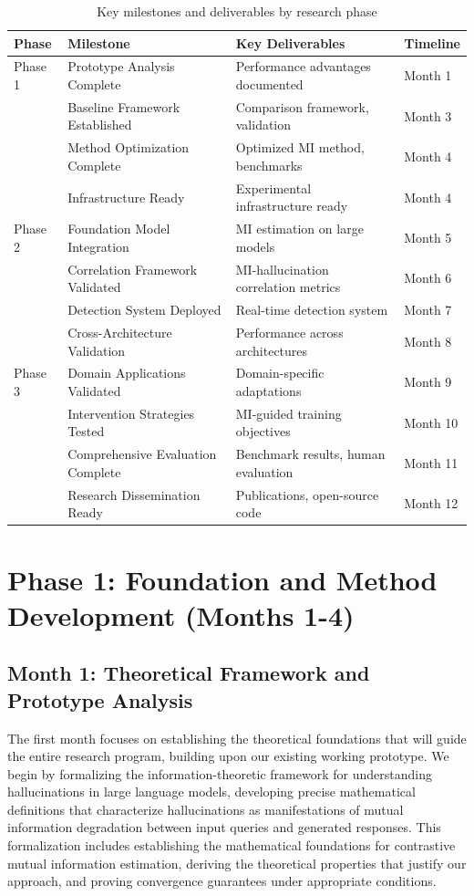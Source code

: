 \documentclass[11pt, oneside]{book}
\theoremstyle{plain}
\theoremstyle{definition}
\theoremstyle{remark}
\begin{document}
\begin{table}[htbp]
\centering
\caption{Key milestones and deliverables by research phase}
\label{tab:milestones}
\small
\begin{tabular}{|l|l|l|l|}
\hline
\textbf{Phase} & \textbf{Milestone} & \textbf{Key Deliverables} & \textbf{Timeline} \\
\hline
Phase 1 & Prototype Analysis Complete & Performance advantages documented & Month 1 \\
& Baseline Framework Established & Comparison framework, validation & Month 3 \\
& Method Optimization Complete & Optimized MI method, benchmarks & Month 4 \\
& Infrastructure Ready & Experimental infrastructure ready & Month 4 \\
\hline
Phase 2 & Foundation Model Integration & MI estimation on large models & Month 5 \\
& Correlation Framework Validated & MI-hallucination correlation metrics & Month 6 \\
& Detection System Deployed & Real-time detection system & Month 7 \\
& Cross-Architecture Validation & Performance across architectures & Month 8 \\
\hline
Phase 3 & Domain Applications Validated & Domain-specific adaptations & Month 9 \\
& Intervention Strategies Tested & MI-guided training objectives & Month 10 \\
& Comprehensive Evaluation Complete & Benchmark results, human evaluation & Month 11 \\
& Research Dissemination Ready & Publications, open-source code & Month 12 \\
\hline
\end{tabular}
\end{table}

\section{Phase 1: Foundation and Method Development (Months 1-4)}

\subsection{Month 1: Theoretical Framework and Prototype Analysis}

The first month focuses on establishing the theoretical foundations that will guide the entire research program, building upon our existing working prototype. We begin by formalizing the information-theoretic framework for understanding hallucinations in large language models, developing precise mathematical definitions that characterize hallucinations as manifestations of mutual information degradation between input queries and generated responses. This formalization includes establishing the mathematical foundations for contrastive mutual information estimation, deriving the theoretical properties that justify our approach, and proving convergence guarantees under appropriate conditions.
\end{document}
